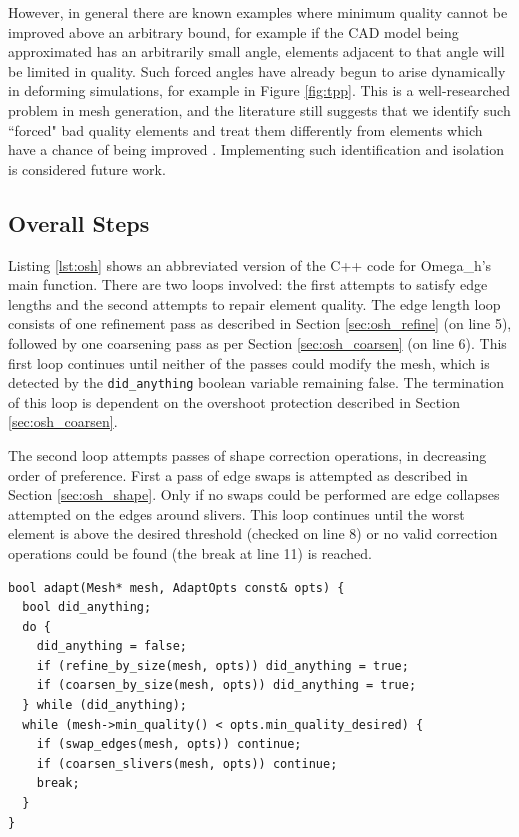 However, in general there are known examples where minimum quality cannot be improved
above an arbitrary bound, for example if the CAD model being approximated has
an arbitrarily small angle, elements adjacent to that angle will be limited
in quality.
Such forced angles have already begun to arise dynamically in
deforming simulations, for example in Figure \ref{fig:tpp}.
This is a well-researched problem in mesh generation, and the literature
still suggests that we identify such ``forced" bad quality elements and treat them
differently from elements which have a chance of being improved \cite{engwirda2016conforming}.
Implementing such identification and isolation is considered future work.

\subsection{Overall Steps}
\label{sec:osh}

Listing \ref{lst:osh} shows an abbreviated version of the C++ code for
Omega\_h's main function.
There are two loops involved: the first attempts to satisfy edge lengths
and the second attempts to repair element quality.
The edge length loop consists of one refinement pass
as described in Section \ref{sec:osh_refine} (on line 5),
followed by one coarsening pass as per Section \ref{sec:osh_coarsen}
(on line 6).
This first loop continues until neither of the passes could modify the mesh,
which is detected by the \texttt{did\_anything} boolean variable
remaining false.
The termination of this loop is dependent on the overshoot
protection described in Section \ref{sec:osh_coarsen}.

The second loop attempts passes of shape correction operations,
in decreasing order of preference.
First a pass of edge swaps is attempted as described in Section \ref{sec:osh_shape}.
Only if no swaps could be performed are edge collapses attempted
on the edges around slivers.
This loop continues until the worst element is above the desired threshold
(checked on line 8) or no valid correction operations could be found
(the break at line 11) is reached.

\begin{lstlisting}[float,style=dan-style,caption=Omega\_h main function,label=lst:osh]
bool adapt(Mesh* mesh, AdaptOpts const& opts) {
  bool did_anything;
  do {
    did_anything = false;
    if (refine_by_size(mesh, opts)) did_anything = true;
    if (coarsen_by_size(mesh, opts)) did_anything = true;
  } while (did_anything);
  while (mesh->min_quality() < opts.min_quality_desired) {
    if (swap_edges(mesh, opts)) continue;
    if (coarsen_slivers(mesh, opts)) continue;
    break;
  }
}
\end{lstlisting}

